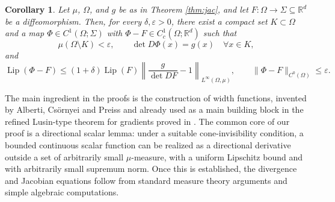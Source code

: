 \documentclass[11pt,a4paper]{article}
\newcommand{\Lip}{\operatorname{Lip}}
\newtheorem{cor}[thm]{Corollary}
\theoremstyle{definition}
\theoremstyle{remark}
\begin{document}
\begin{cor}\label{cor:diff_jac}
Let $\mu$, $\Omega$, and $g$ be as in Theorem \ref{thm:jac}, and let
$F \colon \Omega \to \Sigma \subseteq \mathbb{R}^d$ be a diffeomorphism.
Then, for every $\delta,\varepsilon>0$, there exist a compact set
$K\subset\Omega$ and a map $\Phi\in C^1(\Omega;\Sigma)$ with
$\Phi-F\in C^1_c(\Omega;\mathbb{R}^d)$ such that
$$
\mu(\Omega\setminus K)<\varepsilon,
\qquad
\det D\Phi(x)=g(x)\quad\forall x\in K,
$$
and
$$
\Lip(\Phi-F)\le (1+\delta)\Lip(F)
\left\|\frac{g}{\det DF}-1\right\|_{L^\infty(\Omega,\mu)},
\qquad
\|\Phi-F\|_{C^0(\Omega)}\le \varepsilon.
$$
\end{cor}

The main ingredient in the proofs is the construction of width functions, invented by Alberti, Cs\"ornyei and Preiss and already used as a main building block in the refined Lusin-type theorem for gradients proved in \cite{DMM}.
The common core of our proof is a directional scalar lemma: under a suitable cone-invisibility condition, a bounded continuous scalar function can be realized as a directional derivative outside a set of arbitrarily small $\mu$-measure, with a uniform Lipschitz bound and with arbitrarily small supremum norm.
Once this is established, the divergence and Jacobian equations follow from standard measure theory arguments and simple algebraic computations.
\end{document}
